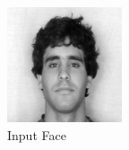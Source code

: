 \documentclass[aps,letterpaper,10pt]{article}
\begin{document}
\begin{figure}[!p]
\centering
\begin{minipage}{.3\textwidth}
\centering
\includegraphics[width=\textwidth]{face_approx/original.png}
\caption{Input Face}
\label{fig:11-2c}
\end{minipage}
\begin{minipage}{.75\textwidth}
\centering
{}\hfill
{}\hfill

\end{minipage}
\end{figure}
\end{document}
